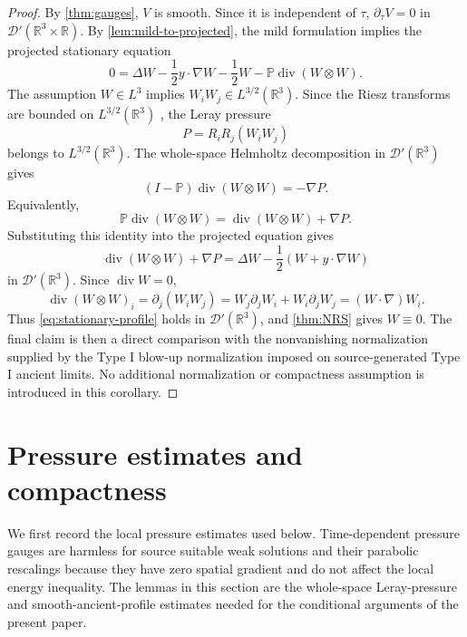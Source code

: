 \documentclass[11pt]{amsart}
\theoremstyle{plain}
\theoremstyle{definition}
\theoremstyle{remark}
\numberwithin{equation}{section}
\begin{document}
\begin{proof}
By \cref{thm:gauges}, \(V\) is smooth.  Since it is independent of \(\tau\),
\(\partial_\tau V=0\) in \(\mathcal D'(\mathbb R^3\times\mathbb R)\).  By
\cref{lem:mild-to-projected}, the mild formulation implies the projected
stationary equation
\[
   0
   =
   \Delta W-\frac12y\cdot\nabla W-\frac12W
   -\mathbb P\operatorname{div}(W\otimes W).
\]
The assumption \(W\in L^3\) implies
\(W_iW_j\in L^{3/2}(\mathbb R^3)\).  Since the Riesz transforms are bounded
on \(L^{3/2}(\mathbb R^3)\) \cite{Stein1970}, the Leray pressure
\[
   P=R_iR_j(W_iW_j)
\]
belongs to \(L^{3/2}(\mathbb R^3)\).  The whole-space Helmholtz decomposition
in \(\mathcal D'(\mathbb R^3)\) \cite{Sohr2001,Galdi2011} gives
\[
   (I-\mathbb P)\operatorname{div}(W\otimes W)=-\nabla P .
\]
Equivalently,
\[
   \mathbb P\operatorname{div}(W\otimes W)
   =
   \operatorname{div}(W\otimes W)+\nabla P .
\]
Substituting this identity into the projected equation gives
\[
   \operatorname{div}(W\otimes W)+\nabla P
   =
   \Delta W-\frac12(W+y\cdot\nabla W)
\]
in \(\mathcal D'(\mathbb R^3)\).  Since \(\operatorname{div}W=0\),
\[
   \operatorname{div}(W\otimes W)_i
   =
   \partial_j(W_iW_j)
   =
   W_j\partial_jW_i+W_i\partial_jW_j
   =
   (W\cdot\nabla)W_i .
\]
Thus \eqref{eq:stationary-profile} holds in \(\mathcal D'(\mathbb R^3)\), and
\cref{thm:NRS} gives \(W\equiv0\).  The final claim is then a direct
comparison with the nonvanishing normalization supplied by the Type I blow-up
normalization imposed on source-generated Type I ancient limits.  No
additional normalization or compactness assumption is introduced in this
corollary.
\end{proof}

\section{Pressure estimates and compactness}

We first record the local pressure estimates used below.  Time-dependent
pressure gauges are harmless for source suitable weak solutions and their
parabolic rescalings because they have zero spatial gradient and do not affect
the local energy inequality.  The lemmas in this section are the whole-space
Leray-pressure and smooth-ancient-profile
estimates needed for the conditional arguments of the present paper.
\end{document}
